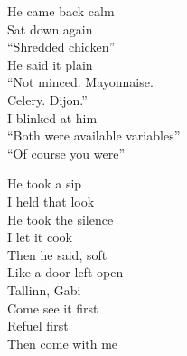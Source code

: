 \begin{lyrics}
He came back calm\\
Sat down again\\
“Shredded chicken”\\
He said it plain\\
“Not minced. Mayonnaise.\\
Celery. Dijon.”\\
I blinked at him\\
“Both were available variables”\\
“Of course you were”

He took a sip\\
I held that look\\
He took the silence\\
I let it cook\\
Then he said, soft\\
Like a door left open\\
Tallinn, Gabi\\
Come see it first\\
Refuel first\\
Then come with me
\end{lyrics}

